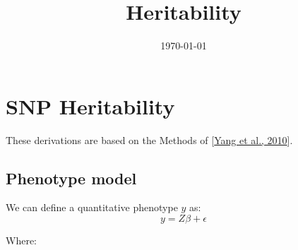 \documentclass[12pt]{article}
\title{Heritability}
\date{\today}
\begin{document}
\maketitle

\section{SNP Heritability}
These derivations are based on the Methods of [\href{https://www.nature.com/articles/ng.608}{Yang et al., 2010}]. 

\subsection{Phenotype model}
We can define a quantitative phenotype $y$ as:
$$ y = Z \beta + \epsilon $$

Where:
\end{document}
